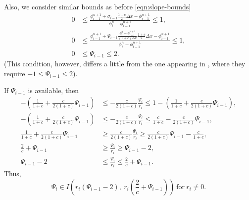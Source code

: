 \documentclass[../thesis.tex]{subfiles}
\begin{document}
\begin{remark}
\begin{equation}
\end{equation}
Also, we consider similar bounds as before \eqref{eqn:slope-bounds}
\begin{equation}
    \begin{split}\label{eqn: Frolkovic - psi bounds}
        0
        &\leq
        \frac{\phi_{i-1}^{n+1}
        +\sigma_{i-1}\frac{1+c}{2}\Delta x
        - \phi_{i-1}^{n+1}}{\phi_{i}^{n} - \phi_{i-1}^{n+1}}
        \leq
        1,
        \\
        0
        &\leq
        \frac{\phi_{i-1}^{n+1}
        +\Psi_{i-1}
        \frac{\phi_{i}^{n}-\phi_{i-1}^{n+1}}
        {(1+c)\Delta x}\frac{1+c}{2}\Delta x
        - \phi_{i-1}^{n+1}}{\phi_{i}^{n} - \phi_{i-1}^{n+1}}
        \leq
        1,
        \\
        0
        &\leq
        \Psi_{i-1}
        \leq
        2.
    \end{split}
\end{equation}
(This condition, however, differs a little from the one appearing in \cite{2023_Frolkovic}, where they require \(-1 \leq \Psi_{i-1} \leq 2\)).

If \(\Psi_{i-1}\) is available, then
\begin{equation}
    \begin{split}
        -\left(
            \frac{1}{1+c} + \frac{c}{2(1+c)}\Psi_{i-1} \right)
        &\leq
        -\frac{c}{2(1+c)}
        \frac{\Psi_{i}}{r_{i}}
        \leq
        1-\left(
            \frac{1}{1+c} + \frac{c}{2(1+c)}\Psi_{i-1} \right),
        \\
        -\left(
            \frac{1}{1+c} + \frac{c}{2(1+c)}\Psi_{i-1} \right)
        &\leq
        -\frac{c}{2(1+c)}
        \frac{\Psi_{i}}{r_{i}}
        \leq
        \frac{c}{1+c} - \frac{c}{2(1+c)}\Psi_{i-1},
        \\
        \frac{1}{1+c} + \frac{c}{2(1+c)}\Psi_{i-1}
        &\geq
        \frac{c}{2(1+c)}
        \frac{\Psi_{i}}{r_{i}}
        \geq
        \frac{c}{2(1+c)}\Psi_{i-1} - \frac{c}{1+c},
        \\
        \frac{2}{c} + \Psi_{i-1}
        &\geq
        \frac{\Psi_{i}}{r_{i}}
        \geq
        \Psi_{i-1} - 2,
        \\
        \Psi_{i-1} - 2
        &\leq
        \frac{\Psi_{i}}{r_{i}}
        \leq
        \frac{2}{c} + \Psi_{i-1}.
    \end{split}
\end{equation}
Thus,
\begin{equation}
    \Psi_{i}
    \in
    I
    \left( r_{i}\left(\Psi_{i-1} - 2\right),
    ~r_{i}\left( \frac{2}{c} + \Psi_{i-1} \right)
    \right)\ \text{for}\ r_{i} \neq 0.
\end{equation}


\end{remark}
\end{document}
